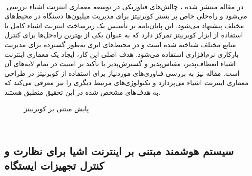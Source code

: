 \paragraph{}{‍
    در مقاله منتشر شده ، چالش‌های فناوریکی در توسعه معماری اینترنت اشیاء بررسی می‌شود و راه‌حلی خاص بر بستر کوبرنیتز برای مدیریت میلیون‌ها دستگاه در محیط‌های مختلف پیشنهاد می‌شود. این پایان‌نامه بر تأسیس یک زیرساخت اینترنت اشیاء کامل با استفاده از ابزار کوبرنیتز تمرکز دارد که به عنوان یکی از بهترین راه‌حل‌ها برای کنترل منابع مختلف شناخته شده است و در محیط‌های ابری به‌طور گسترده برای مدیریت بارکاری نرم‌افزاری استفاده می‌شود. هدف اصلی این کار، ایجاد یک معماری اینترنت اشیاء انعطاف‌پذیر، مقیاس‌پذیر و گسترش‌پذیر با تأکید بر امنیت در تمام لایه‌های آن است. مقاله نیز به بررسی فناوری‌های موردنیاز برای استفاده از کوبرنیتز در طراحی معماری اینترنت اشیاء می‌پردازد و تکنولوژی‌های مرتبط دیگری را نیز معرفی می‌کند که به هدف‌های مشخص شده در این تحقیق منطبق هستند.
    \begin{figure}[H]
        \caption{پایش مبتنی بر کوبرنیتز }
        \label{fig:iot_monitoring}
    \end{figure}
‍}



\subsection{
    سیستم هوشمند مبتنی بر اینترنت اشیا برای نظارت و کنترل تجهیزات ایستگاه
}
\label{subsec:iot_controlling_sub_stations}
